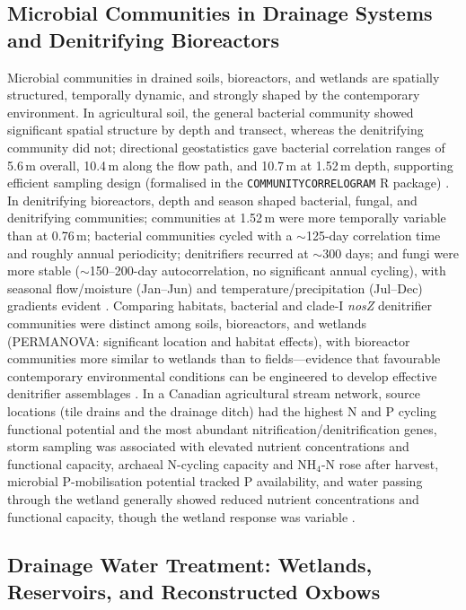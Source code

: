 \documentclass[11pt]{article}
\begin{document}
\subsection{Microbial Communities in Drainage Systems and Denitrifying Bioreactors}

Microbial communities in drained soils, bioreactors, and wetlands are spatially structured, temporally dynamic, and strongly shaped by the contemporary environment. In agricultural soil, the general bacterial community showed significant spatial structure by depth and transect, whereas the denitrifying community did not; directional geostatistics gave bacterial correlation ranges of 5.6\,m overall, 10.4\,m along the flow path, and 10.7\,m at 1.52\,m depth, supporting efficient sampling design (formalised in the \texttt{COMMUNITYCORRELOGRAM} R package) \parencite{Andrus2014}. In denitrifying bioreactors, depth and season shaped bacterial, fungal, and denitrifying communities; communities at 1.52\,m were more temporally variable than at 0.76\,m; bacterial communities cycled with a $\sim$125-day correlation time and roughly annual periodicity; denitrifiers recurred at $\sim$300 days; and fungi were more stable ($\sim$150--200-day autocorrelation, no significant annual cycling), with seasonal flow/moisture (Jan--Jun) and temperature/precipitation (Jul--Dec) gradients evident \parencite{Porter2015}. Comparing habitats, bacterial and clade-I \textit{nosZ} denitrifier communities were distinct among soils, bioreactors, and wetlands (PERMANOVA: significant location and habitat effects), with bioreactor communities more similar to wetlands than to fields---evidence that favourable contemporary environmental conditions can be engineered to develop effective denitrifier assemblages \parencite{Hathaway2015}. In a Canadian agricultural stream network, source locations (tile drains and the drainage ditch) had the highest N and P cycling functional potential and the most abundant nitrification/denitrification genes, storm sampling was associated with elevated nutrient concentrations and functional capacity, archaeal N-cycling capacity and NH$_4$-N rose after harvest, microbial P-mobilisation potential tracked P availability, and water passing through the wetland generally showed reduced nutrient concentrations and functional capacity, though the wetland response was variable \parencite{Knorr2023}.

\subsection{Drainage Water Treatment: Wetlands, Reservoirs, and Reconstructed Oxbows}
\end{document}
